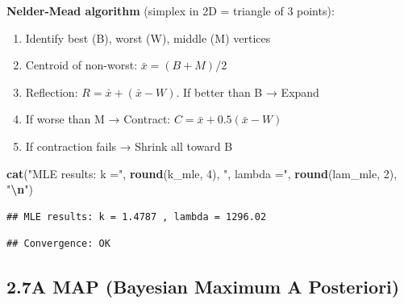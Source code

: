 \documentclass[
]{article}
\newenvironment{Shaded}{\begin{snugshade}}{\end{snugshade}}
\newcommand{\DecValTok}[1]{\textcolor[rgb]{0.00,0.00,0.81}{#1}}
\newcommand{\FunctionTok}[1]{\textcolor[rgb]{0.13,0.29,0.53}{\textbf{#1}}}
\newcommand{\NormalTok}[1]{#1}
\newcommand{\SpecialCharTok}[1]{\textcolor[rgb]{0.81,0.36,0.00}{\textbf{#1}}}
\newcommand{\StringTok}[1]{\textcolor[rgb]{0.31,0.60,0.02}{#1}}
\providecommand{\tightlist}{%
  \setlength{\itemsep}{0pt}\setlength{\parskip}{0pt}}
\begin{document}
\textbf{Nelder-Mead algorithm} (simplex in 2D = triangle of 3 points):

\begin{enumerate}
\def\labelenumi{\arabic{enumi}.}
\tightlist
\item
  Identify best (B), worst (W), middle (M) vertices
\item
  Centroid of non-worst: \(\bar{x} = (B+M)/2\)
\item
  Reflection: \(R = \bar{x} + (\bar{x} - W)\). If better than B → Expand
\item
  If worse than M → Contract: \(C = \bar{x} + 0.5(\bar{x} - W)\)
\item
  If contraction fails → Shrink all toward B
\end{enumerate}

\begin{Shaded}
\begin{Highlighting}[]
\FunctionTok{cat}\NormalTok{(}\StringTok{"MLE results: k ="}\NormalTok{, }\FunctionTok{round}\NormalTok{(k\_mle, }\DecValTok{4}\NormalTok{), }\StringTok{", lambda ="}\NormalTok{, }\FunctionTok{round}\NormalTok{(lam\_mle, }\DecValTok{2}\NormalTok{), }\StringTok{"}\SpecialCharTok{\textbackslash{}n}\StringTok{"}\NormalTok{)}
\end{Highlighting}
\end{Shaded}

\begin{verbatim}
## MLE results: k = 1.4787 , lambda = 1296.02
\end{verbatim}

\begin{Shaded}
\end{Shaded}

\begin{verbatim}
## Convergence: OK
\end{verbatim}

\subsection{2.7A MAP (Bayesian Maximum A
Posteriori)}\label{a-map-bayesian-maximum-a-posteriori}
\end{document}

